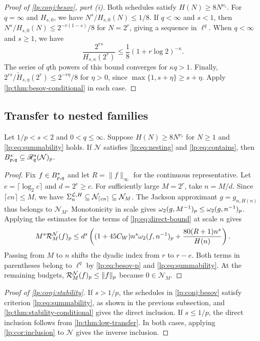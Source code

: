 \documentclass[11pt,a4paper]{article}
\begin{document}
\begin{proof}[Proof of \cref{lp:conj:besov}, part (i)]
Both schedules satisfy $H(N)\ge8N^{\nu_s}$. For $q=\infty$ and $H_{s,0}$, we have $N^s/H_{s,0}(N)\le1/8$. If $q<\infty$ and $s<1$, then
$N^s/H_{s,0}(N)\le2^{-r(1-s)}/8$ for $N=2^r$, giving a sequence in $\ell^q$.
When $q<\infty$ and $s\ge1$, we have
\[
 \frac{2^{rs}}{H_{s,\kappa}(2^r)}\le\frac{1}{8}(1+r\log 2)^{-\kappa}.
\]
The series of $q$th powers of this bound converges for $\kappa q>1$. Finally,
$2^{rs}/\widetilde H_{s,\eta}(2^r)\le2^{-r\eta}/8$ for $\eta>0$, since $\max\{1,s+\eta\}\ge s+\eta$. Apply \cref{lp:thm:besov-conditional} in each case.
\end{proof}

\subsection{Transfer to nested families}

\begin{proposicao}
\label{lp:thm:stability-conditional}
Let $1/p<s<2$ and $0<q\le\infty$. Suppose $H(N)\ge8N^{\nu_s}$ for $N\ge1$ and \eqref{lp:eq:summability} holds. If $\mathcal N$ satisfies \eqref{lp:eq:nesting} and \eqref{lp:eq:contains}, then $B^{s}_{p,q}\subseteq\mathscr R^{s}_{q}(\mathcal N)_p$.
\end{proposicao}

\begin{proof}
Fix $f\in B^{s}_{p,q}$ and let $R=\|f\|_\infty$ for the continuous representative. Let $e=\lceil\log_2 c\rceil$ and $d=2^e\ge c$. For sufficiently large $M=2^r$, take $n=M/d$. Since $\lceil cn\rceil\le M$, we have
$\Sigma_{n}^{\mathcal L,H}\subseteq\mathcal N_{\lceil cn\rceil}\subseteq\mathcal N_M$.
The Jackson approximant $g=g_{n,H(n)}$ thus belongs to $\mathcal N_M$.
Monotonicity in scale gives $\omega_2(g,M^{-1})_{p}\le\omega_2(g,n^{-1})_{p}$. Applying the estimates for the terms of \eqref{lp:eq:direct-bound} at scale $n$ gives
\[
 M^s\mathcal R^{\mathcal N}_{M}(f)_p
 \le d^s\left((1+45C_W)n^s\omega_2(f,n^{-1})_{p}+\frac{80(R+1)n^s}{H(n)}\right).
\]
Passing from $M$ to $n$ shifts the dyadic index from $r$ to $r-e$. Both terms in parentheses belong to $\ell^q$ by \eqref{lp:eq:besov-p} and \eqref{lp:eq:summability}. At the remaining budgets, $\mathcal R^{\mathcal N}_{M}(f)_p\le\|f\|_p$ because $0\in\mathcal N_M$.
\end{proof}

\begin{proof}[Proof of \cref{lp:conj:stability}]
If $s>1/p$, the schedules in \cref{lp:conj:besov} satisfy criterion \eqref{lp:eq:summability}, as shown in the previous subsection, and \cref{lp:thm:stability-conditional} gives the direct inclusion. If $s\le1/p$, the direct inclusion follows from \cref{lp:thm:low-transfer}. In both cases, applying \cref{lp:cor:inclusion} to $\mathcal N$ gives the inverse inclusion.
\end{proof}
\end{document}
